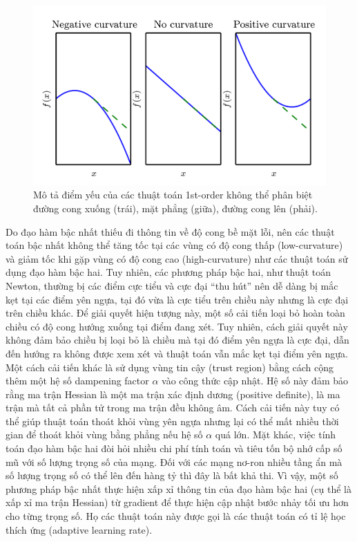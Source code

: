 \begin{figure}[htp]
\centering
\includegraphics[width=120 mm]{images/hessian.png}
\caption{Mô tả điểm yếu của các thuật toán 1st-order không thể phân biệt đường cong xuống (trái), mặt phẳng (giữa), đường cong lên (phải). \cite{goodfellow2016deeplearning}}
\label{fig:hessian}
\end{figure}

Do đạo hàm bậc nhất thiếu đi thông tin về độ cong bề mặt lỗi, nên các thuật toán bậc nhất không thể tăng tốc tại các vùng có độ cong thấp (low-curvature) và giảm tốc khi gặp vùng có độ cong cao (high-curvature) như các thuật toán sử dụng đạo hàm bậc hai. Tuy nhiên, các phương pháp bậc hai, như thuật toán Newton, thường bị các điểm cực tiểu và cực đại ``thu hút'' nên dễ dàng bị mắc kẹt tại các điểm yên ngựa, tại đó vừa là cực tiểu trên chiều này nhưng là cực đại trên chiều khác. Để giải quyết hiện tượng này, một số cải tiến loại bỏ hoàn toàn chiều có độ cong hướng xuống tại điểm đang xét. Tuy nhiên, cách giải quyết này không đảm bảo chiều bị loại bỏ là chiều mà tại đó điểm yên ngựa là cực đại, dẫn đến hướng ra không được xem xét và thuật toán vẫn mắc kẹt tại điểm yên ngựa. Một cách cải tiến khác là sử dụng vùng tin cậy (trust region) bằng cách cộng thêm một hệ số dampening factor $\alpha$ vào công thức cập nhật. Hệ số này đảm bảo rằng ma trận Hessian là một ma trận xác định dương (positive definite), là ma trận mà tất cả phần tử trong ma trận đều không âm. Cách cải tiến này tuy có thể giúp thuật toán thoát khỏi vùng yên ngựa nhưng lại có thể mất nhiều thời gian để thoát khỏi vùng bằng phẳng nếu hệ số $\alpha$ quá lớn. Mặt khác, việc tính toán đạo hàm bậc hai đòi hỏi nhiều chi phí tính toán và tiêu tốn bộ nhớ cấp số mũ với số lượng trọng số của mạng. Đối với các mạng nơ-ron nhiều tầng ẩn mà số lượng trọng số có thể lên đến hàng tỷ thì đây là bất khả thi. Vì vậy, một số phương pháp bậc nhất thực hiện xấp xỉ thông tin của đạo hàm bậc hai (cụ thể là xấp xỉ ma trận Hessian) từ gradient để thực hiện cập nhật bước nhảy tối ưu hơn cho từng trọng số. Họ các thuật toán này được gọi là các thuật toán có tỉ lệ học thích ứng (adaptive learning rate).

